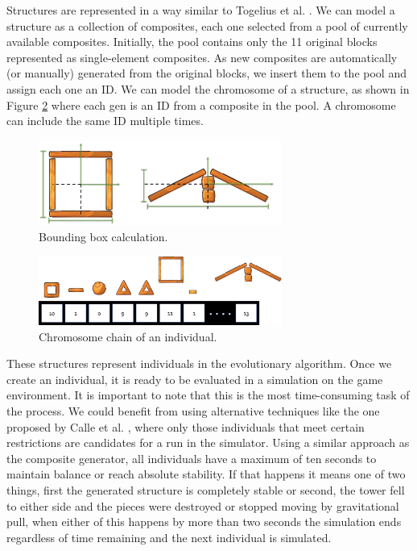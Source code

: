 \documentclass[conference]{IEEEtran}
\begin{document}
Structures are represented in a way similar to Togelius et al.
\cite{togelius2016Representationsforsearch-basedmethods}. We can model a
structure as a collection of composites, each one selected from a pool of
currently available composites. Initially, the pool contains only the 11
original blocks represented as single-element composites. As new composites are
automatically (or manually) generated from the original blocks, we insert them
to the pool and assign each one an ID. We can model the chromosome of a
structure, as shown in Figure \ref{old_chrom} where each gen is an ID from a
composite in the pool. A chromosome can include the same ID multiple times.
    
    \begin{figure}[htbp]
    \centerline{\includegraphics[width=80mm]{Images/bounding_box_calculation.png}}
    \caption{Bounding box calculation.}
    \label{bounding_boc_calc}
    \end{figure}
    
    \begin{figure}[htbp]
    \centerline{\includegraphics[width=80mm]{Images/chromosome_chain_example.png}}
    \caption{Chromosome chain of an individual.}
    \label{old_chrom}
    \end{figure}
    
    These structures represent individuals in the evolutionary algorithm. Once
    we create an individual, it is ready to be evaluated in a simulation on the
    game environment.  It is important to note that this is the most
    time-consuming task of the process. We could benefit from using alternative
    techniques like the one proposed by Calle et al. \cite{lauracalle}, where
    only those individuals that meet certain restrictions are candidates for a
    run in the simulator.
    Using a similar approach as the composite generator, all
    individuals have a maximum of ten seconds to maintain balance or reach
    absolute stability. If that happens  it means one of two
    things, first the generated structure is completely stable or second, the
    tower fell to either side and the pieces were destroyed or stopped moving by
    gravitational pull, when either of this happens by more than two seconds the
    simulation ends regardless of time remaining and the next individual is
    simulated.
\end{document}
